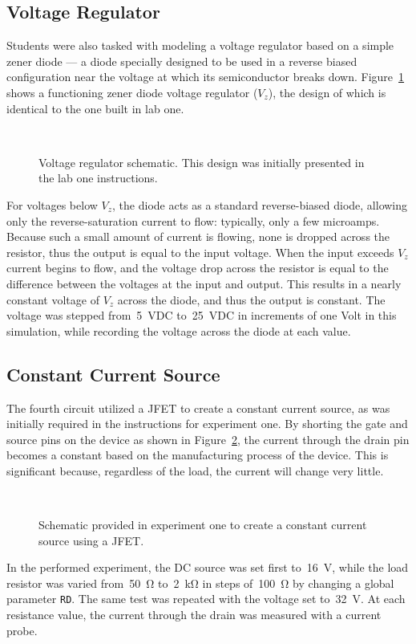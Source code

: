 \subsection{Voltage Regulator}
Students were also tasked with modeling a voltage regulator based on a simple
zener diode --- a diode specially designed to be used in a reverse biased
configuration near the voltage at which its semiconductor breaks down.
Figure~\ref{fig:schem3} shows a functioning zener diode voltage regulator
($V_z$), the design of which is identical to the one built in lab one.
%
\begin{figure}[H]
	\centering
	\\
	\parbox{3.5in}{
	\caption[Schematic --- Voltage Regulator]{Voltage regulator schematic.
		This design was initially presented in the lab one instructions.}
	\label{fig:schem3}}
\end{figure}
%
For voltages below $V_z$, the diode acts as a standard reverse-biased diode,
allowing only the reverse-saturation current to flow: typically, only a few
microamps.  Because such a small amount of current is flowing, none is dropped
across the resistor, thus the output is equal to the input voltage.  When the
input exceeds $V_z$ current begins to flow, and the voltage drop across the
resistor is equal to the difference between the voltages at the input and
output.  This results in a nearly constant voltage of $V_z$ across the diode,
and thus the output is constant.  The voltage was stepped from~\SI{5}{\volt}DC
to~\SI{25}{\volt}{DC} in increments of one Volt in this simulation, while
recording the voltage across the diode at each value.

\subsection{Constant Current Source}
The fourth circuit utilized a JFET to create a constant current source, as was
initially required in the instructions for experiment one.  By shorting the
gate and source pins on the device as shown in Figure~\ref{fig:schem4}, the
current through the drain pin becomes a constant based on the manufacturing
process of the device.  This is significant because, regardless of the load,
the current will change very little.
%
\begin{figure}[H]
	\centering
	\\
	\parbox{3.5in}{
	\caption[Schematic --- Constant Current Source]{Schematic provided in
		experiment one to create a constant current source using a JFET.}
	\label{fig:schem4}}
\end{figure}
%
In the performed experiment, the DC source was set first to~\SI{16}{\volt},
while the load resistor was varied from~\SI{50}{\ohm} to~\SI{2}{\kilo\ohm} in
steps of~\SI{100}{\ohm} by changing a global parameter \texttt{RD}.  The same
test was repeated with the voltage set to~\SI{32}{\volt}.  At each resistance
value, the current through the drain was measured with a current probe.

